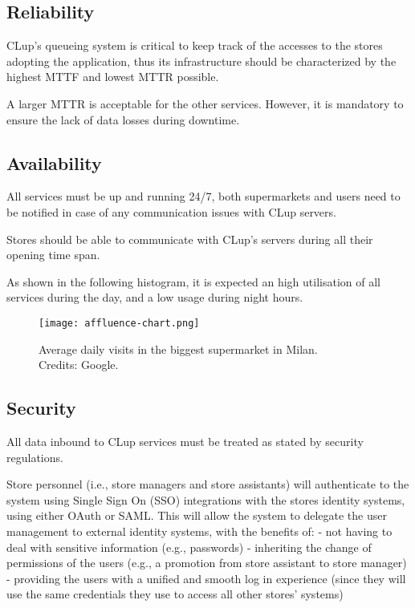 \documentclass[../../main.tex]{subfiles}
\begin{document}
	\subsection{Reliability}

	CLup's queueing system is critical to keep track of the accesses to the stores adopting the application, thus its infrastructure 
	should be characterized by the highest MTTF and lowest MTTR possible.

	A larger MTTR is acceptable for the other services. However, it is mandatory to ensure the lack of 
	data losses during downtime.

	\subsection{Availability}

	All services must be up and running 24/7, both supermarkets and users need to be notified in case of 
	any communication issues with CLup servers.

	Stores should be able to communicate with CLup's servers during all their opening time span.

	As shown in the following histogram, it is expected an high utilisation of all services during the day, 
	and a low usage during night hours.

	\begin{figure}[H]
	    \centering
	    \texttt{[image: affluence-chart.png]}
	    \caption{Average daily visits in the biggest supermarket in Milan. \\Credits: Google.}
  	\end{figure}

	\subsection{Security}

	All data inbound to CLup services must be treated as stated by security regulations. 

	Store personnel (i.e., store managers and store assistants) will authenticate to the system using Single Sign On (SSO) integrations with the stores identity systems, using either OAuth or SAML. This will allow the system to delegate the user management to external identity systems, with the benefits of:
	- not having to deal with sensitive information (e.g., passwords)
	- inheriting the change of permissions of the users (e.g., a promotion from store assistant to store manager)
	- providing the users with a unified and smooth log in experience (since they will use the same credentials they use to access all other stores' systems)
\end{document}
